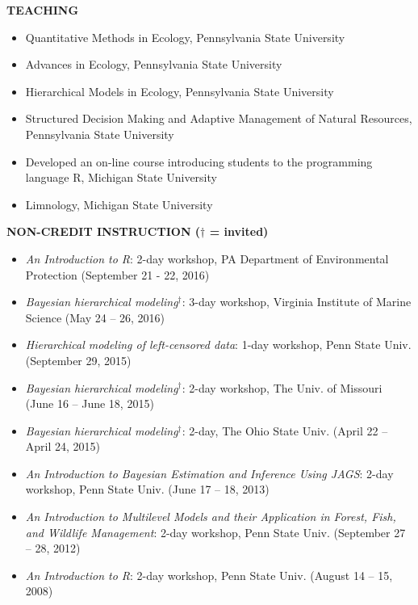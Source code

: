 \documentclass[10pt]{article}
\begin{document}
\begin{flushleft}
\vspace{8pt}
\centerline {\bf{TEACHING}}
\vspace{5pt}
\begin{itemize}
\item Quantitative Methods in Ecology, Pennsylvania State University\\
\item Advances in Ecology, Pennsylvania State University\\
\item Hierarchical Models in Ecology, Pennsylvania State University\\
\item Structured Decision Making and Adaptive Management of Natural Resources, Pennsylvania State University\\
\item Developed an on-line course introducing students to the programming language R, Michigan State University\\
\item Limnology, Michigan State University\\
\end{itemize}

\vspace{8pt}
\centerline {\bf{NON-CREDIT INSTRUCTION ({\small $\dagger$ = invited})}}
\vspace{5pt}
\begin{itemize}
\item \emph{An Introduction to R}: 2-day workshop, PA Department of Environmental Protection (September 21 - 22, 2016)\\
\item \emph{Bayesian hierarchical modeling}$^\dagger$: 3-day workshop, Virginia Institute of Marine Science (May 24 -- 26, 2016)\\
\item \emph{Hierarchical modeling of left-censored data}: 1-day workshop, Penn State Univ. (September 29, 2015)
\item \emph{Bayesian hierarchical modeling}$^\dagger$: 2-day workshop, The Univ. of Missouri (June 16 -- June 18, 2015)\\
\item \emph{Bayesian hierarchical modeling}$^\dagger$: 2-day, The Ohio State Univ. (April 22 --  April 24, 2015)\\
\item \emph{An Introduction to Bayesian Estimation and Inference Using JAGS}: 2-day workshop, Penn State Univ. (June 17 -- 18, 2013)\\
\item \emph{An Introduction to Multilevel Models and their Application in Forest, Fish, and Wildlife Management}: 2-day workshop, Penn State Univ. (September 27 -- 28, 2012)\\
\item \emph{An Introduction to R}: 2-day workshop, Penn State Univ. (August 14 -- 15, 2008)\\


\end{itemize}
\end{flushleft}
\end{document}
